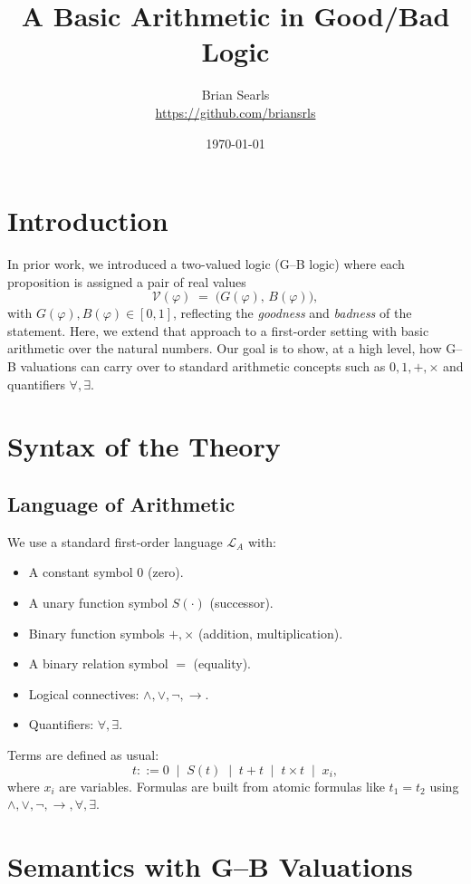 \documentclass[11pt]{article}
\title{A Basic Arithmetic in Good/Bad Logic}
\author{Brian Searls\\\href{https://github.com/briansrls}{https://github.com/briansrls}}
\date{\today}
\begin{document}
\maketitle

\section{Introduction}

In prior work, we introduced a two-valued logic (G--B logic) where each proposition 
is assigned a pair of real values
\[
   \mathcal{V}(\varphi) \;=\; \bigl(G(\varphi),\,B(\varphi)\bigr),
\]
with $G(\varphi), B(\varphi) \in [0,1]$, reflecting the \emph{goodness} and \emph{badness} of the statement. 
Here, we extend that approach to a first-order setting with basic arithmetic over the natural numbers. 
Our goal is to show, at a high level, how G--B valuations can carry over to standard arithmetic 
concepts such as $0,1,+,\times$ and quantifiers $\forall,\exists$.

\section{Syntax of the Theory}

\subsection{Language of Arithmetic}

We use a standard first-order language $\mathcal{L}_A$ with:
\begin{itemize}
    \item A constant symbol $0$ (zero).
    \item A unary function symbol $S(\cdot)$ (successor).
    \item Binary function symbols $+,\times$ (addition, multiplication).
    \item A binary relation symbol $=$ (equality).
    \item Logical connectives: $\land,\lor,\lnot,\to$.
    \item Quantifiers: $\forall,\exists$.
\end{itemize}

Terms are defined as usual: 
\[
  t ::= 0 \;\mid\; S(t) \;\mid\; t + t \;\mid\; t \times t \;\mid\; x_i,
\]
where $x_i$ are variables. Formulas are built from atomic formulas like $t_1 = t_2$ using 
$\land,\lor,\lnot,\to,\forall,\exists$.

\section{Semantics with G--B Valuations}
\end{document}
